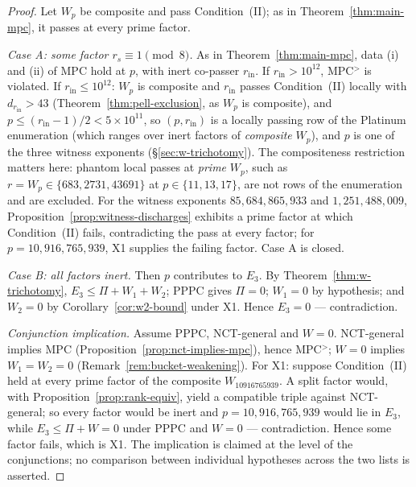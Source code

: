 \documentclass[11pt]{amsart}
\theoremstyle{plain}
\theoremstyle{definition}
\theoremstyle{remark}
\numberwithin{equation}{section}
\begin{document}
\begin{proof}
Let $W_p$ be composite and pass Condition~(II); as in Theorem~\ref{thm:main-mpc}, it passes at every prime factor.

\emph{Case A: some factor $r_s \equiv 1 \pmod 8$.} As in Theorem~\ref{thm:main-mpc}, data (i) and (ii) of MPC hold at $p$, with inert co-passer $r_{\mathrm{in}}$. If $r_{\mathrm{in}} > 10^{12}$, MPC$^{>}$ is violated. If $r_{\mathrm{in}} \leq 10^{12}$: $W_p$ is composite and $r_{\mathrm{in}}$ passes Condition~(II) locally with $d_{r_{\mathrm{in}}} > 43$ (Theorem~\ref{thm:pell-exclusion}, as $W_p$ is composite), and $p \leq (r_{\mathrm{in}}-1)/2 < 5 \times 10^{11}$, so $(p, r_{\mathrm{in}})$ is a locally passing row of the Platinum enumeration (which ranges over inert factors of \emph{composite} $W_p$), and $p$ is one of the three witness exponents (\S\ref{sec:w-trichotomy}). The compositeness restriction matters here: phantom local passes at \emph{prime} $W_p$, such as $r = W_p \in \{683, 2731, 43691\}$ at $p \in \{11, 13, 17\}$, are not rows of the enumeration and are excluded. For the witness exponents $85{,}684{,}865{,}933$ and $1{,}251{,}488{,}009$, Proposition~\ref{prop:witness-discharges} exhibits a prime factor at which Condition~(II) fails, contradicting the pass at every factor; for $p = 10{,}916{,}765{,}939$, X1 supplies the failing factor. Case A is closed.

\emph{Case B: all factors inert.} Then $p$ contributes to $E_3$. By Theorem~\ref{thm:w-trichotomy}, $E_3 \leq \Pi + W_1 + W_2$; PPPC gives $\Pi = 0$; $W_1 = 0$ by hypothesis; and $W_2 = 0$ by Corollary~\ref{cor:w2-bound} under X1. Hence $E_3 = 0$ --- contradiction.

\emph{Conjunction implication.} Assume PPPC, NCT-general and $W = 0$. NCT-general implies MPC (Proposition~\ref{prop:nct-implies-mpc}), hence MPC$^{>}$; $W = 0$ implies $W_1 = W_2 = 0$ (Remark~\ref{rem:bucket-weakening}). For X1: suppose Condition~(II) held at every prime factor of the composite $W_{10916765939}$. A split factor would, with Proposition~\ref{prop:rank-equiv}, yield a compatible triple against NCT-general; so every factor would be inert and $p = 10{,}916{,}765{,}939$ would lie in $E_3$, while $E_3 \leq \Pi + W = 0$ under PPPC and $W = 0$ --- contradiction. Hence some factor fails, which is X1. The implication is claimed at the level of the conjunctions; no comparison between individual hypotheses across the two lists is asserted.
\end{proof}
\end{document}

